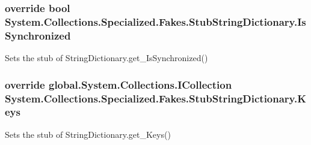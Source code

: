 \hypertarget{class_system_1_1_collections_1_1_specialized_1_1_fakes_1_1_stub_string_dictionary_a4a8c034237ac0de9b7c197e43aaff723}{
\subsubsection[{Is\-Synchronized}]{\setlength{\rightskip}{0pt plus 5cm}override bool System.\-Collections.\-Specialized.\-Fakes.\-Stub\-String\-Dictionary.\-Is\-Synchronized\hspace{0.3cm}{\ttfamily [get]}}}\label{class_system_1_1_collections_1_1_specialized_1_1_fakes_1_1_stub_string_dictionary_a4a8c034237ac0de9b7c197e43aaff723}


Sets the stub of String\-Dictionary.\-get\-\_\-\-Is\-Synchronized()

\hypertarget{class_system_1_1_collections_1_1_specialized_1_1_fakes_1_1_stub_string_dictionary_a206c4fadd55f9a6b51ad47b82a3344fd}{
\subsubsection[{Keys}]{\setlength{\rightskip}{0pt plus 5cm}override global.\-System.\-Collections.\-I\-Collection System.\-Collections.\-Specialized.\-Fakes.\-Stub\-String\-Dictionary.\-Keys\hspace{0.3cm}{\ttfamily [get]}}}\label{class_system_1_1_collections_1_1_specialized_1_1_fakes_1_1_stub_string_dictionary_a206c4fadd55f9a6b51ad47b82a3344fd}


Sets the stub of String\-Dictionary.\-get\-\_\-\-Keys()

